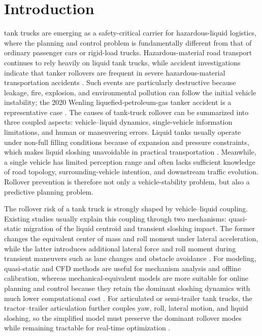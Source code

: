 \section{Introduction}
 tank trucks are emerging as a safety-critical carrier for hazardous-liquid logistics, where the planning and control problem is fundamentally different from that of ordinary passenger cars or rigid-load trucks. Hazardous-material road transport continues to rely heavily on liquid tank trucks, while accident investigations indicate that tanker rollovers are frequent in severe hazardous-material transportation accidents \cite{qianyuyan2023,authority_tank_truck2022}. Such events are particularly destructive because leakage, fire, explosion, and environmental pollution can follow the initial vehicle instability; the 2020 Wenling liquefied-petroleum-gas tanker accident is a representative case \cite{wenling_accident2022}. The causes of tank-truck rollover can be summarized into three coupled aspects: vehicle--liquid dynamics, single-vehicle information limitations, and human or maneuvering errors. Liquid tanks usually operate under non-full filling conditions because of expansion and pressure constraints, which makes liquid sloshing unavoidable in practical transportation \cite{biaozhunR00052011}. Meanwhile, a single vehicle has limited perception range and often lacks sufficient knowledge of road topology, surrounding-vehicle intention, and downstream traffic evolution. Rollover prevention is therefore not only a vehicle-stability problem, but also a predictive planning problem.

The rollover risk of a tank truck is strongly shaped by vehicle--liquid coupling. Existing studies usually explain this coupling through two mechanisms: quasi-static migration of the liquid centroid and transient sloshing impact. The former changes the equivalent center of mass and roll moment under lateral acceleration, while the latter introduces additional lateral force and roll moment during transient maneuvers such as lane changes and obstacle avoidance \cite{maohaijian2021fsi,wangxiaorun2022lateralacc,wanying2020antirolover}. For modeling, quasi-static and CFD methods are useful for mechanism analysis and offline calibration, whereas mechanical-equivalent models are more suitable for online planning and control because they retain the dominant sloshing dynamics with much lower computational cost \cite{yuzhixin2018mpc,zhaoweiqiang2019semitrailer,Komasa2023observing,KomasaQi2025AntiRollover_TITS}. For articulated or semi-trailer tank trucks, the tractor--trailer articulation further couples yaw, roll, lateral motion, and liquid sloshing, so the simplified model must preserve the dominant rollover modes while remaining tractable for real-time optimization \cite{zongchangfu2014identification}.

